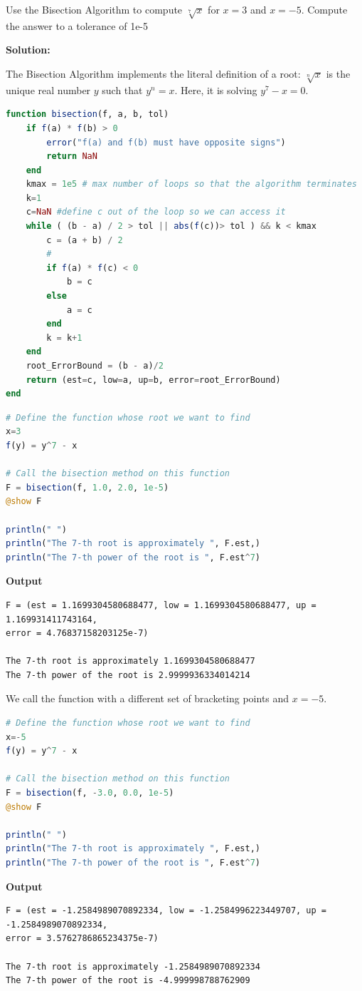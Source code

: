 \bigskip

\begin{example} Use the Bisection Algorithm to compute $\sqrt[7]{x}$ for $x=3$ and $x = -5$. Compute the answer to a tolerance of 1e-5
\end{example}
\textbf{Solution:}

The Bisection Algorithm implements the literal definition of a root: $\sqrt[n]{x}$ is the unique real number $y$ such that $y^n = x$. Here, it is solving
$y^7 - x = 0$.

\begin{lstlisting}[language=Julia,style=mystyle]
function bisection(f, a, b, tol)
    if f(a) * f(b) > 0
        error("f(a) and f(b) must have opposite signs")
        return NaN
    end
    kmax = 1e5 # max number of loops so that the algorithm terminates
    k=1
    c=NaN #define c out of the loop so we can access it
    while ( (b - a) / 2 > tol || abs(f(c))> tol ) && k < kmax
        c = (a + b) / 2
        #
        if f(a) * f(c) < 0
            b = c
        else
            a = c
        end
        k = k+1
    end
    root_ErrorBound = (b - a)/2
    return (est=c, low=a, up=b, error=root_ErrorBound)
end
\end{lstlisting}

\bigskip

\begin{lstlisting}[language=Julia,style=mystyle]
# Define the function whose root we want to find
x=3
f(y) = y^7 - x

# Call the bisection method on this function
F = bisection(f, 1.0, 2.0, 1e-5)
@show F

println(" ")
println("The 7-th root is approximately ", F.est,)
println("The 7-th power of the root is ", F.est^7)
\end{lstlisting}
\textbf{Output} 
\begin{verbatim}
F = (est = 1.1699304580688477, low = 1.1699304580688477, up = 1.169931411743164, 
error = 4.76837158203125e-7)
 
The 7-th root is approximately 1.1699304580688477
The 7-th power of the root is 2.9999936334014214
\end{verbatim}

We call the function with a different set of bracketing points and $x=-5$.

\begin{lstlisting}[language=Julia,style=mystyle]
# Define the function whose root we want to find
x=-5
f(y) = y^7 - x

# Call the bisection method on this function
F = bisection(f, -3.0, 0.0, 1e-5)
@show F

println(" ")
println("The 7-th root is approximately ", F.est,)
println("The 7-th power of the root is ", F.est^7)
\end{lstlisting}
\textbf{Output} 
\begin{verbatim}
F = (est = -1.2584989070892334, low = -1.2584996223449707, up = -1.2584989070892334, 
error = 3.5762786865234375e-7)
 
The 7-th root is approximately -1.2584989070892334
The 7-th power of the root is -4.999998788762909
\end{verbatim}


